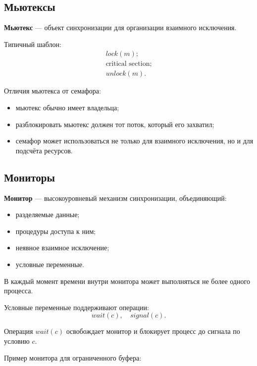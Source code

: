 \documentclass[12pt,a4paper]{article}
\begin{document}
\subsection{Мьютексы}

\textbf{Мьютекс} --- объект синхронизации для организации взаимного исключения.

Типичный шаблон:
\[
\begin{array}{l}
lock(m);\\
\text{critical section};\\
unlock(m).
\end{array}
\]

Отличия мьютекса от семафора:
\begin{itemize}
    \item мьютекс обычно имеет владельца;
    \item разблокировать мьютекс должен тот поток, который его захватил;
    \item семафор может использоваться не только для взаимного исключения, но и для подсчёта ресурсов.
\end{itemize}

\subsection{Мониторы}

\textbf{Монитор} --- высокоуровневый механизм синхронизации, объединяющий:
\begin{itemize}
    \item разделяемые данные;
    \item процедуры доступа к ним;
    \item неявное взаимное исключение;
    \item условные переменные.
\end{itemize}

В каждый момент времени внутри монитора может выполняться не более одного процесса.

Условные переменные поддерживают операции:
\[
wait(c), \quad signal(c).
\]

Операция $wait(c)$ освобождает монитор и блокирует процесс до сигнала по условию $c$.

Пример монитора для ограниченного буфера:
\end{document}
